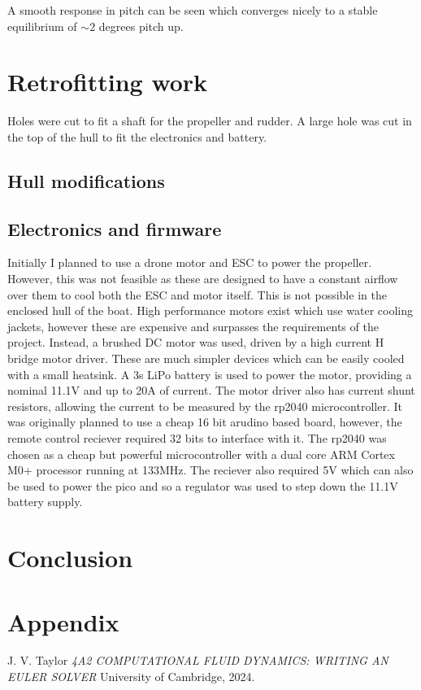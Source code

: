 \documentclass{article}
\begin{document}
A smooth response in pitch can be seen which converges nicely to a stable equilibrium of $\sim2$ degrees pitch up.



\section{Retrofitting work}

Holes were cut to fit a shaft for the propeller and rudder.
A large hole was cut in the top of the hull to fit the electronics and battery.


\subsection{Hull modifications}

\subsection{Electronics and firmware}

Initially I planned to use a drone motor and ESC to power the propeller.
However, this was not feasible as these are designed to have a constant airflow over them to cool both the ESC and motor itself.
This is not possible in the enclosed hull of the boat.
High performance motors exist which use water cooling jackets, however these are expensive and surpasses the requirements of the project.
Instead, a brushed DC motor was used, driven by a high current H bridge motor driver.
These are much simpler devices which can be easily cooled with a small heatsink.
A 3s LiPo battery is used to power the motor, providing a nominal 11.1V and up to 20A of current.
The motor driver also has current shunt resistors, allowing the current to be measured by the rp2040 microcontroller.
It was originally planned to use a cheap 16 bit arudino based board, however, the remote control reciever required 32 bits to interface with it.
The rp2040 was chosen as a cheap but powerful microcontroller with a dual core ARM Cortex M0+ processor running at 133MHz.
The reciever also required 5V which can also be used to power the pico and so a regulator was used to step down the 11.1V battery supply.


\section{Conclusion}


\section{Appendix}



\begin{thebibliography}{9}

  J. V. Taylor
  \emph{4A2 COMPUTATIONAL FLUID DYNAMICS: WRITING AN EULER SOLVER}
  University of Cambridge,
  2024.

\end{thebibliography}
\end{document}
